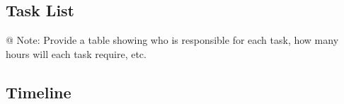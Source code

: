 \subsection{Task List}




\begin{TempText}
	@ Note: Provide a table showing who is responsible for each task, how many hours will each task require, etc.
\end{TempText}




\subsection{Timeline}

